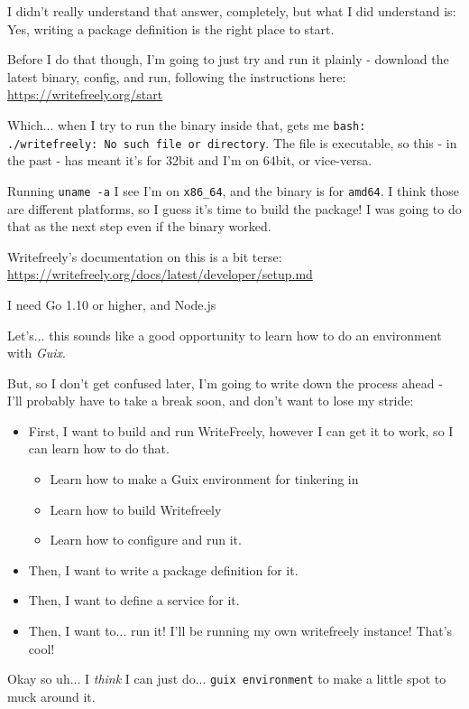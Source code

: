 \documentclass[11pt]{article}
\begin{document}
I didn't really understand that answer, completely, but what I did
understand is: Yes, writing a package definition is the right place to
start.

Before I do that though, I'm going to just try and run it plainly -
download the latest binary, config, and run, following the
instructions here: \url{https://writefreely.org/start}

Which... when I try to run the binary inside that, gets me \texttt{bash:
./writefreely: No such file or directory}. The file is executable, so
this - in the past - has meant it's for 32bit and I'm on 64bit, or
vice-versa.

Running \texttt{uname -a} I see I'm on \texttt{x86\_64}, and the binary is for
\texttt{amd64}. I think those are different platforms, so I guess it's time
to build the package! I was going to do that as the next step even if
the binary worked.

Writefreely's documentation on this is a bit terse:
\url{https://writefreely.org/docs/latest/developer/setup.md}

I need Go 1.10 or higher, and Node.js

Let's... this sounds like a good opportunity to learn how to do an
environment with \emph{Guix}.

But, so I don't get confused later, I'm going to write down the
process ahead - I'll probably have to take a break soon, and don't
want to lose my stride:

\begin{itemize}
\item First, I want to build and run WriteFreely, however I can get it to
work, so I can learn how to do that.
\begin{itemize}
\item Learn how to make a Guix environment for tinkering in
\item Learn how to build Writefreely
\item Learn how to configure and run it.
\end{itemize}
\item Then, I want to write a package definition for it.
\item Then, I want to define a service for it.
\item Then, I want to... run it! I'll be running my own writefreely
instance! That's cool!
\end{itemize}

Okay so uh... I \emph{think} I can just do... \texttt{guix environment} to make a
little spot to muck around it.
\end{document}
